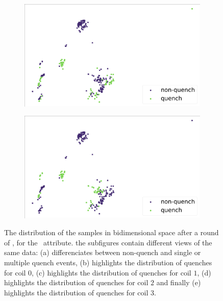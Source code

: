 \begin{figure}[!h]
\begin{subfigure}{0.49\linewidth}
		\subcaption{}
	\end{subfigure}
	\begin{subfigure}{0.49\linewidth}
		\includegraphics[width=\linewidth]{img/quench_dist_qlp/quenches_coil_2_Cnmod.png}
		\subcaption{}
	\end{subfigure}
	\begin{subfigure}{0.49\linewidth}
		\includegraphics[width=\linewidth]{img/quench_dist_qlp/quenches_coil_3_Cnmod.png}
		\subcaption{}
	\end{subfigure}
	\caption{The distribution of the samples in bidimensional space after a round of \pca, for
		the \cnmod\ attribute. the subfigures contain different views of the same data: (a) differenciates between non-quench and single or multiple quench events, (b) highlights the distribution of quenches for coil $0$, (c) highlights the distribution of quenches for coil $1$, (d) highlights the distribution of quenches for coil $2$ and finally (e) highlights the distribution of quenches for coil $3$.}
	\label{fig:cnmod-coilq-dist}
\end{figure}

